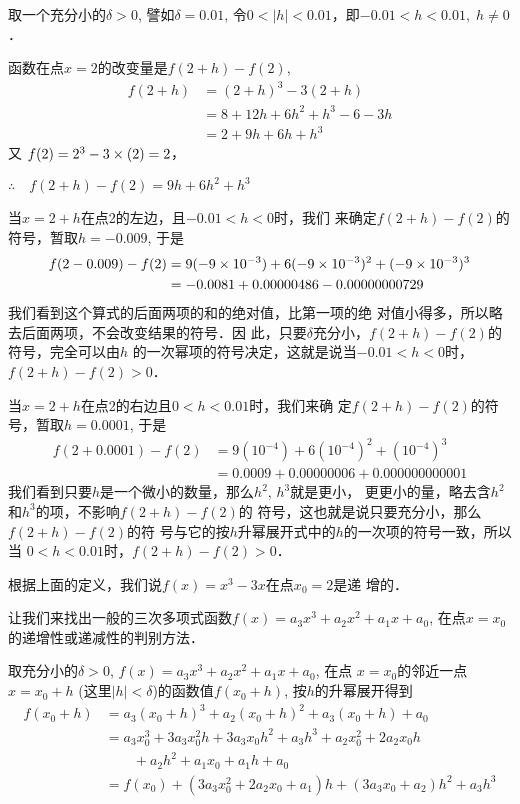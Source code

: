 \begin{solution}
    取一个充分小的$\delta>0$, 譬如$\delta=0.01$, 令$0<|h|<0.01$，即$-0.01<h<0.01,\; h\ne 0$．

    函数在点$x=2$的改变量是$f(2+h)-f(2)$,
\[\begin{split}
    f(2+h)&=(2 +h)^3-3(2+h)\\
  &  =8+12h+6h^2+h^3-6-3h\\
   & =2+9h+6h+h^3
\end{split} \]   
    又
  $  f(2)=2^3-3\times(2)=2$，


$\therefore\quad f(2+h)-f(2)=9h+6h^2+h^3$

    当$x=2+h$在点2的左边，且$-0.01<h<0$时，我们
    来确定$f(2+h)-f(2)$的符号，暂取$h=-0.009$, 于是
\[\begin{split}
      f(2-0.009)-f(2)&=9(-9\times10^{-3})+6(-9\times10^{-3})^2+(-9\times10^{-3})^3\\
 &   =-0.0081+0.00000486-0.00000000729  
\end{split}\]
    我们看到这个算式的后面两项的和的绝对值，比第一项的绝
    对值小得多，所以略去后面两项，不会改变结果的符号．因
    此，只要$\delta$充分小，$f(2+h)-f(2)$的符号，完全可以由$h$
    的一次幂项的符号决定，这就是说当$-0.01<h<0$时，$f(2+h)-f(2)>0$．

    当$x=2+h$在点2的右边且$0<h<0.01$时，我们来确
    定$f(2+h)-f(2)$的符号，暂取$h=0.0001$, 于是
\[\begin{split}
    f(2+0.0001)-f(2)&=9(10^{-4})+6(10^{-4})^2+(10^{-4})^3\\
  &  =0.0009+0.00000006+0.000000000001
\end{split}\]
    我们看到只要$h$是一个微小的数量，那么$h^2$, $h^3$就是更小，
    更更小的量，略去含$h^2$和$h^3$的项，不影响$f(2+h)-f(2)$的
    符号，这也就是说只要充分小，那么$f(2+h)-f(2)$的符
    号与它的按$h$升幂展开式中的$h$的一次项的符号一致，所以当
    $0<h<0.01$时，$f(2+h)-f(2)>0$．

    根据上面的定义，我们说$f(x)=x^3-3x$在点$x_0=2$是递
增的．
\end{solution}

让我们来找出一般的三次多项式函数$f(x)=a_3x^3+a_2x^2
+a_1x+a_0$, 在点$x=x_0$的递增性或递减性的判别方法．

取充分小的$\delta>0$, $f(x)=a_3x^3+a_2x^2
+a_1x+a_0$, 在点
$x=x_0$的邻近一点$x=x_0+h$ (这里$|h|<\delta$)的函数值$f(x_0+h)$, 
按$h$的升幂展开得到
\[\begin{split}
    f(x_0+h) &= a_3 (x_0 +h)^3 +a_2(x_0 +h)^2 + a_3 (x_0 +h) + a_0\\
&=a_3x_0^3+3a_3x_0^2h+3a_3x_0h^2+a_3h^3+a_2x_0^2+2a_2x_0h\\
&\qquad +a_2h^2+a_1x_0+a_1h+a_0\\
&=f(x_0)+(3a_3x_0^2+2a_2x_0+a_1)h+(3a_3x_0+
a_2)h^2+a_3h^3
\end{split}\]

